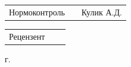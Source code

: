 \begin{FlushLeft}
{  \vspace{14pt}

  \begin{tabular}{p{6.5cm} p{4.767cm} p{5.633cm}}
    \raggedleft Нормоконтроль & & Кулик А.Д. \\
  \end{tabular}

  \vspace{14pt}

  \begin{tabular}{p{6.5cm} p{4.767cm} p{5.633cm}}
    \raggedleft Рецензент & &            \\
  \end{tabular}
  
}\end{FlushLeft}

\begin{Center}{
\cyrillicfontsf 
\englishfontsf
\fontsize{14pt}{21pt} г.
}\end{Center}

\newpage %